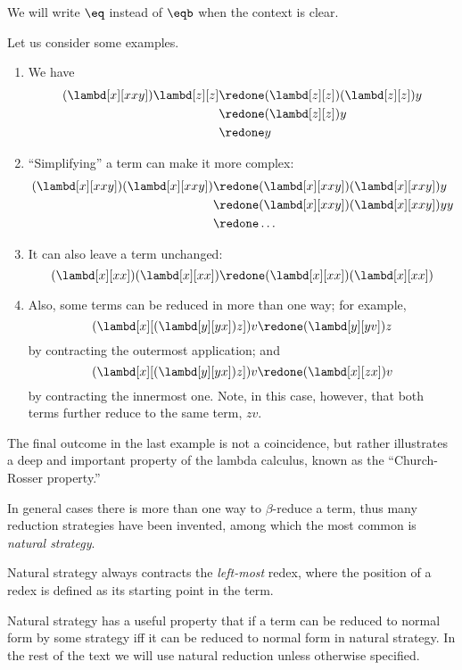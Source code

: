\documentclass[../../../include/open-logic-section]{subfiles}
\begin{document}
We will write $\eq$ instead of $\eqb$ when the context is clear.

Let us consider some examples.
\begin{enumerate}
\item We have
\begin{align*}
(\lambd[x][xxy]) \lambd[z][z] & \redone (\lambd[z][z])(\lambd[z][z]) y \\
& \redone (\lambd[z][z]) y \\
& \redone y
\end{align*}
\item ``Simplifying'' a term can make it more complex:
\begin{align*}
(\lambd[x][xxy])(\lambd[x][xxy]) & \redone (\lambd[x][xxy])(\lambd[x][xxy])y \\
& \redone (\lambd[x][xxy])(\lambd[x][xxy])yy \\
& \redone \dots
\end{align*}
\item It can also leave a term unchanged:
\[
(\lambd[x][xx])(\lambd[x][xx]) \redone (\lambd[x][xx])(\lambd[x][xx])
\]
\item Also, some terms can be reduced in more than one way; for
  example,
\[
(\lambd[x][(\lambd[y][yx]) z]) v \redone (\lambd[y][yv]) z
\]
by contracting the outermost application; and
\[
(\lambd[x][(\lambd[y][yx]) z]) v \redone (\lambd[x][zx]) v
\]
by contracting the innermost one. Note, in this case, however, that
both terms further reduce to the same term, $zv$.
\end{enumerate}

The final outcome in the last example is not a coincidence, but rather
illustrates a deep and important property of the lambda calculus, known as the
``Church-Rosser property.''

\begin{digress}
  In general cases there is more than one way to $\beta$-reduce a
  term, thus many reduction strategies have been invented, among which
  the most common is \emph{natural strategy}.
  
  Natural strategy always contracts the \emph{left-most}
  redex, where the position of a redex is defined as its starting
  point in the term.

  Natural strategy has a useful property that if a term can be reduced
  to normal form by some strategy iff it can be reduced to normal form in
  natural strategy. In the rest of the text we will use natural
  reduction unless otherwise specified. 
\end{digress}
\end{document}
